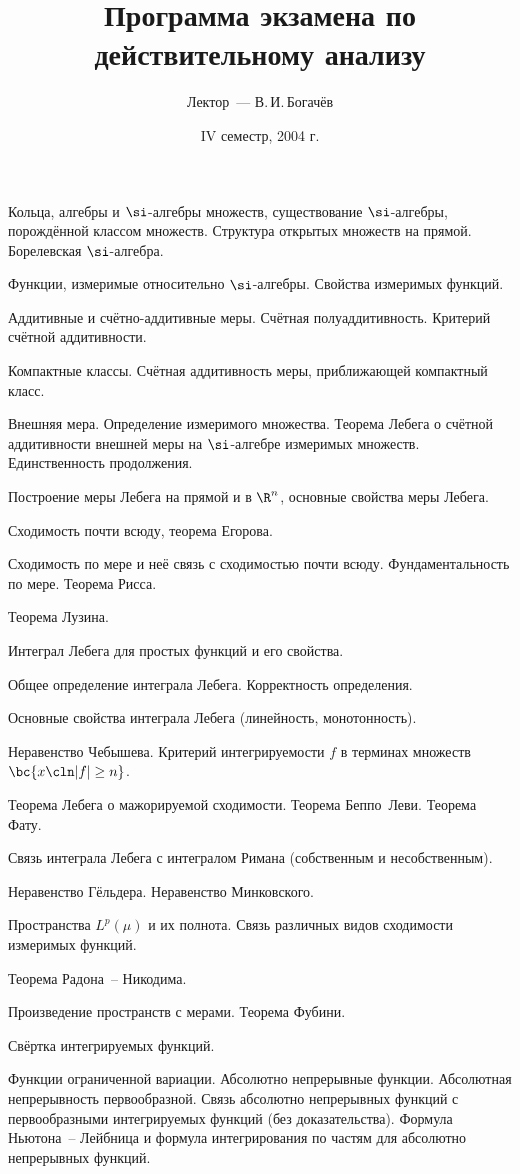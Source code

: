 \documentclass[a4paper]{article}
\title{Программа экзамена по действительному анализу}
\author{Лектор~--- В.\,И.\,Богачёв}
\date{IV семестр, 2004 г.}
\begin{document}
\maketitle

\begin{nums}{-2}
\item Кольца, алгебры и $\si$-алгебры множеств, существование $\si$-алгебры,
      порождённой классом множеств. Структура открытых множеств на прямой.
      Борелевская $\si$-алгебра.
\item Функции, измеримые относительно $\si$-алгебры. Свойства измеримых функций.
\item Аддитивные и счётно-аддитивные меры. Счётная полуаддитивность. Критерий счётной аддитивности.
\item Компактные классы. Счётная аддитивность меры, приближающей компактный класс.
\item Внешняя мера. Определение измеримого множества. Теорема Лебега о
      счётной аддитивности внешней меры на $\si$-алгебре измеримых
      множеств. Единственность продолжения.
\item Построение меры Лебега на прямой и в $\R^n$, основные свойства меры Лебега.
\item Сходимость почти всюду, теорема Егорова.
\item Сходимость по мере и неё связь с сходимостью почти всюду.
      Фундаментальность по мере. Теорема Рисса.
\item Теорема Лузина.
\item Интеграл Лебега для простых функций и его свойства.
\item Общее определение интеграла Лебега. Корректность определения.
\item Основные свойства интеграла Лебега (линейность, монотонность).
\item Неравенство Чебышева. Критерий интегрируемости $f$ в терминах множеств $\bc{x\cln |f| \ge n}$.
\item Теорема Лебега о мажорируемой сходимости. Теорема Беппо~Леви. Теорема Фату.
\item Связь интеграла Лебега с интегралом Римана (собственным и несобственным).
\item Неравенство Гёльдера. Неравенство Минковского.
\item Пространства $L^p(\mu)$ и их полнота. Связь различных видов сходимости измеримых функций.
\item Теорема Радона~-- Никодима.
\item Произведение пространств с мерами. Теорема Фубини.
\item Свёртка интегрируемых функций.
\item Функции ограниченной вариации. Абсолютно непрерывные функции.
      Абсолютная непрерывность первообразной. Связь абсолютно непрерывных
      функций с первообразными интегрируемых функций (без доказательства).
      Формула Ньютона~-- Лейбница и формула интегрирования по частям
      для абсолютно непрерывных функций.
\end{nums}

\medskip
\dmvntrail
\end{document}
